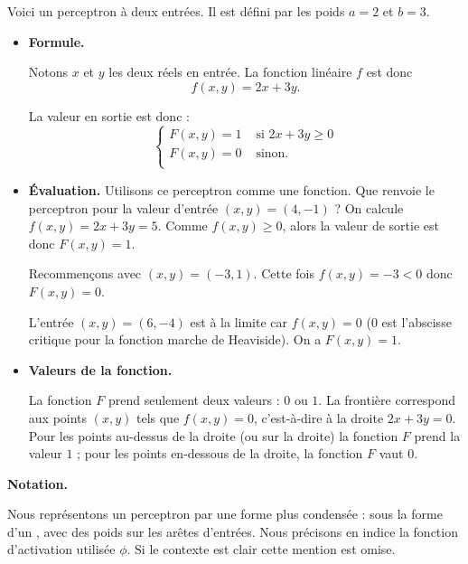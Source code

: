 \begin{exemple}{}{}
	
	Voici un perceptron à deux entrées. Il est défini par les poids $a=2$ et $b=3$.
	
	
	
	\begin{itemize}
		\item \textbf{Formule.}
		
		Notons $x$ et $y$ les deux réels en entrée.
		La fonction linéaire $f$ est donc 
		$$f(x,y) = 2x+3y.$$
		
		La valeur en sortie est donc :
		$$\begin{cases}
			F(x,y) = 1 & \text{ si } 2x+3y \ge 0 \\
			F(x,y) = 0  & \text{ sinon.} \\
		\end{cases}$$
		
		
		\item \textbf{\'Evaluation.} 
		Utilisons ce perceptron comme une fonction. Que renvoie le perceptron pour la valeur d'entrée $(x,y) = (4,-1)$ ?
		On calcule $f(x,y) = 2x+3y = 5$. Comme $f(x,y)\ge0$, alors la valeur de sortie est donc $F(x,y) = 1$.
		
		Recommençons avec $(x,y) = (-3,1)$. Cette fois $f(x,y) = -3 < 0$ donc $F(x,y) = 0$.
		
		L'entrée $(x,y) = (6,-4)$ est \og{}à la limite\fg{} car $f(x,y)=0$ ($0$ est l'abscisse critique pour la fonction marche de Heaviside).
		On a $F(x,y) = 1$.
		
		\item \textbf{Valeurs de la fonction.}
		
		La fonction $F$ prend seulement deux valeurs : $0$ ou $1$. La frontière correspond aux points $(x,y)$ tels que
		$f(x,y)=0$, c'est-à-dire à la droite $2x+3y=0$.  
		Pour les points au-dessus de la droite (ou sur la droite) la fonction $F$ prend la valeur $1$ ;
		pour les points en-dessous de la droite, la fonction $F$ vaut $0$.
		
		
	\end{itemize}
\end{exemple}

\textbf{Notation.}

Nous représentons un perceptron par une forme plus condensée : 
sous la forme d'un   , avec des poids sur les arêtes d'entrées. 
Nous précisons en indice la fonction d'activation utilisée  $\phi$.
Si le contexte est clair cette mention est omise.

